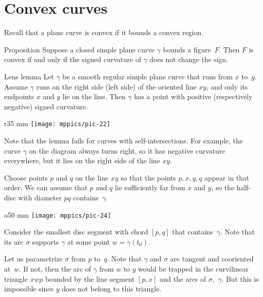 \section{Convex curves}

Recall that a plane curve is convex if it bounds a convex region.

\begin{thm}{Proposition}\label{prop:convex}
Suppose a closed simple plane curve $\gamma$ bounds a figure~$F$.
Then $F$ is convex if and only if the signed curvature of $\gamma$ does not change the sign.
\end{thm}


\begin{thm}{Lens lemma}\label{lem:lens}
Let $\gamma$ be a smooth regular simple plane curve that runs from $x$ to~$y$.
Assume $\gamma$ runs on the right side (left side) of the oriented line $xy$, and only its endpoints $x$ and $y$ lie on the line.
Then $\gamma$ has a point with positive (respectively negative) signed curvature.
\end{thm}

{

\begin{wrapfigure}{r}{35 mm}
\vskip-4mm
\centering
\texttt{[image: mppics/pic-22]}
\vskip0mm
\end{wrapfigure}

Note that the lemma fails for curves with self-intersections.
For example, the curve $\gamma$ on the diagram always turns right, 
so it has negative curvature everywhere, but it lies on the right side of the line $xy$.

}

Choose points $p$ and $q$ on the line $xy$
so that the points $p, x, y, q$ appear in that order.
We can assume that $p$ and $q$ lie sufficiently far from $x$ and $y$, so the half-disc with diameter $pq$ contains~$\gamma$.

\begin{wrapfigure}[6]{o}{50 mm}
\vskip-3mm
\centering
\texttt{[image: mppics/pic-24]}
\end{wrapfigure}

Consider the smallest disc segment with chord $[p,q]$ that contains~$\gamma$.
Note that its arc $\sigma$ supports $\gamma$ at some point $w=\gamma(t_0)$.

Let us parametrize $\sigma$ from $p$ to~$q$.
Note that $\gamma$ and $\sigma$ are tangent and cooriented at~$w$.
If not, then the arc of $\gamma$ from $w$ to $y$ would be trapped in the curvilinear triangle $xwp$ bounded by the line segment $[p,x]$ and the arcs of $\sigma$,~$\gamma$.
But this is impossible since $y$ does not belong to this triangle.

